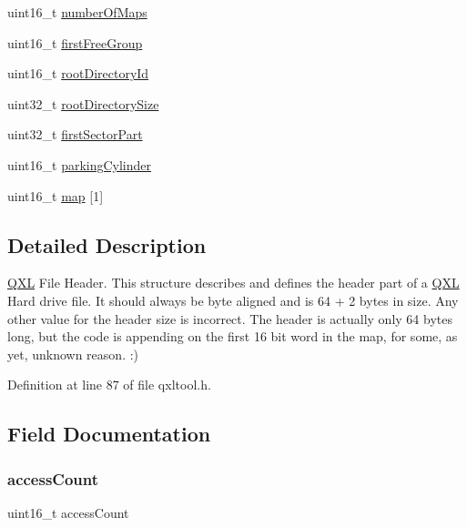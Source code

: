 \begin{DoxyCompactItemize}
\item 
uint16\+\_\+t \hyperlink{struct_h_e_a_d_e_r_ad0f24f728c7ece99956bae1a9c6726f1}{number\+Of\+Maps}
\item 
uint16\+\_\+t \hyperlink{struct_h_e_a_d_e_r_ab853d0b9724f018631a3f861e272d36c}{first\+Free\+Group}
\item 
uint16\+\_\+t \hyperlink{struct_h_e_a_d_e_r_ad0d94bf1241a8ec122e5ac3e6c19a841}{root\+Directory\+Id}
\item 
uint32\+\_\+t \hyperlink{struct_h_e_a_d_e_r_a0ac17e24e43742a704cce1364be65ed8}{root\+Directory\+Size}
\item 
uint32\+\_\+t \hyperlink{struct_h_e_a_d_e_r_a168350b9db93e729a465c0f49f205014}{first\+Sector\+Part}
\item 
uint16\+\_\+t \hyperlink{struct_h_e_a_d_e_r_a00f36c99fabc0f8e10249e80e54ca9c8}{parking\+Cylinder}
\item 
uint16\+\_\+t \hyperlink{struct_h_e_a_d_e_r_a29b7fd8fc79af9f8e87044e61338b35b}{map} \mbox{[}1\mbox{]}
\end{DoxyCompactItemize}


\subsection{Detailed Description}
\hyperlink{struct_q_x_l}{Q\+XL} File Header. This structure describes and defines the header part of a \hyperlink{struct_q_x_l}{Q\+XL} Hard drive file. It should always be byte aligned and is 64 + 2 bytes in size. Any other value for the header size is incorrect. The header is actually only 64 bytes long, but the code is appending on the first 16 bit word in the map, for some, as yet, unknown reason. \+:) 

Definition at line 87 of file qxltool.\+h.



\subsection{Field Documentation}
\mbox{\label{struct_h_e_a_d_e_r_afc2d7713c108e80878e5e57fa3b8f082}} 
\subsubsection{\texorpdfstring{access\+Count}{accessCount}}
{\footnotesize\ttfamily uint16\+\_\+t access\+Count}

